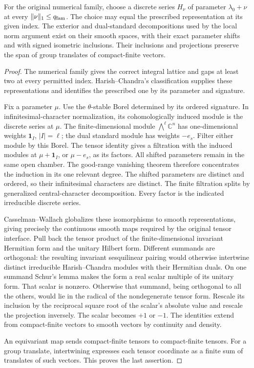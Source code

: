\begin{theorem}\label{original-signed-pieri-family}
For the original numerical family, choose a discrete series
$H_\nu$ of parameter $\lambda_0+\nu$ at every
$\|\nu\|_1\le q_{\rm fam}$. The choice may equal the prescribed
representation at its given index.
The exterior and dual-standard decompositions used by the local
norm argument exist on their smooth spaces, with their exact
parameter shifts and with signed isometric inclusions.
Their inclusions and projections preserve the span of group
translates of compact-finite vectors.
\end{theorem}
\begin{proof}
The numerical family gives the correct integral lattice and gaps
at least two at every permitted index. Harish--Chandra's
classification supplies these representations and identifies
the prescribed one by its parameter and signature.

Fix a parameter $\mu$. Use the $\theta$-stable Borel determined by
its ordered signature. In infinitesimal-character normalization,
its cohomologically induced module is the discrete series at $\mu$.
The finite-dimensional module $\bigwedge^\ell\mathbb C^n$ has
one-dimensional weights $\mathbf1_I$, $|I|=\ell$;
the dual standard module has weights $-e_s$.
Filter either module by this Borel. The tensor identity gives a
filtration with the induced modules at $\mu+\mathbf1_I$,
or $\mu-e_s$, as its factors. All shifted parameters remain in
the same open chamber. The good-range vanishing theorem therefore
concentrates the induction in its one relevant degree.
The shifted parameters are distinct and ordered, so their
infinitesimal characters are distinct. The finite filtration splits
by generalized central-character decomposition. Every factor is
the indicated irreducible discrete series.

Casselman--Wallach globalizes these isomorphisms to smooth
representations, giving precisely the continuous smooth maps required
by the original tensor interface. Pull back the tensor product of
the finite-dimensional invariant Hermitian form and the unitary
Hilbert form. Different summands are orthogonal: the resulting
invariant sesquilinear pairing would otherwise intertwine distinct
irreducible Harish--Chandra modules with their Hermitian duals.
On one summand Schur's lemma makes the form a real scalar multiple
of its unitary form. That scalar is nonzero. Otherwise that summand,
being orthogonal to all the others, would lie in the radical of the
nondegenerate tensor form. Rescale its inclusion by the reciprocal
square root of the scalar's absolute value and rescale the
projection inversely. The scalar becomes $+1$ or $-1$.
The identities extend from compact-finite vectors to smooth vectors
by continuity and density.

An equivariant map sends compact-finite tensors to compact-finite
tensors. For a group translate, intertwining expresses each tensor
coordinate as a finite sum of translates of such vectors.
This proves the last assertion.
\end{proof}

